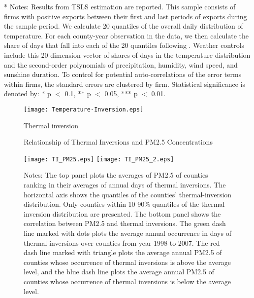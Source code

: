 \documentclass[12pt]{article}
\begin{document}
\begin{table}[H]
\begin{tabular}{l*{4}{c}}
        \hline\hline
      \end{tabular}
      \begin{tablenotes}
        \item[*] \small Notes: Results from TSLS estimation are reported. This sample consists of firms with positive exports between their first and last periods of exports during the sample period. We calculate 20 quantiles of the overall daily distribution of temperature. For each county-year observation in the data, we then calculate the share of days that fall into each of the 20 quantiles following \citep{deschenes2017defensive}. Weather controls include this 20-dimension vector of shares of days in the temperature distribution and the second-order polynomials of precipitation, humidity, wind speed, and sunshine duration. To control for potential auto-correlations of the error terms within firms, the standard errors are clustered by firm. Statistical significance is denoted by: * p $<$ 0.1, ** p $<$ 0.05, *** p $<$ 0.01.
      \end{tablenotes}
      \end{table}

\newpage
\begin{figure}[H]\centering 
  \caption{Thermal inversion\protect\footnotemark} \label{fig:1}
  \texttt{[image: Temperature-Inversion.eps]}
\end{figure}


  \begin{figure}[H]
    \caption{Relationship of Thermal Inversions and PM2.5 Concentrations}\label{fig:2}
    \centering
      \texttt{[image: TI\_PM25.eps]}
      \texttt{[image: TI\_PM25\_2.eps]}
    \small
    \caption*{Notes: The top panel plots the averages of PM2.5 of counties ranking in their averages of annual days of thermal inversions. The horizontal axis shows the quantiles of the counties' thermal-inversion distribution. Only counties within 10-90\% quantiles of the thermal-inversion distribution are presented.  
    The bottom panel shows the correlation between PM2.5 and thermal inversions. The green  dash line marked with dots plots the average annual occurrence in days of thermal inversions over counties from year 1998 to 2007. The red dash line marked with triangle plots the average annual PM2.5 of counties whose occurrence of thermal inversions is above the average level, and the blue dash line plots the average annual PM2.5 of counties whose occurrence of thermal inversions is below the average level.}
  \end{figure}
\end{document}
